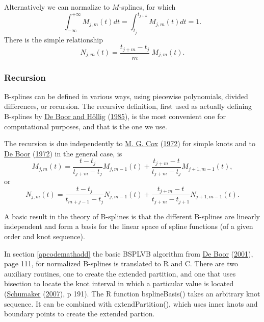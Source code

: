 \documentclass[
  12pt,
]{book}
\theoremstyle{definition}
\theoremstyle{definition}
\theoremstyle{definition}
\theoremstyle{definition}
\theoremstyle{remark}
\begin{document}
Alternatively we can normalize to \(M\)-splines, for which
\begin{equation}\label{E:mint}
\int_{-\infty}^{+\infty}M_{j,m}(t)dt=\int_{t_j}^{t_{j+k}}M_{j,m}(t)dt=1.
\end{equation}
There is the simple relationship
\begin{equation}\label{E:NM}
N_{j,m}(t)=\frac{t_{j+m}-t_j}{m}\ M_{j,m}(t).
\end{equation}

\hypertarget{mathbrecursion}{%
\subsubsection{Recursion}\label{mathbrecursion}}

B-splines can be defined in various ways, using piecewise polynomials, divided differences, or recursion. The recursive definition, first used as actually defining B-splines by \protect\hyperlink{ref-deboor_hollig_85}{De Boor and Höllig} (\protect\hyperlink{ref-deboor_hollig_85}{1985}), is the most convenient one for computational purposes, and that is the one we use.

The recursion is due independently to \protect\hyperlink{ref-cox_72}{M. G. Cox} (\protect\hyperlink{ref-cox_72}{1972}) for simple knots and to \protect\hyperlink{ref-deboor_72}{De Boor} (\protect\hyperlink{ref-deboor_72}{1972}) in the general case, is
\begin{equation}\label{E:Mspline}
M_{j,m}(t)=\frac{t-t_j}{t_{j+m}-t_j}M_{j,m-1}(t)+\frac{t_{j+m}-t}{t_{j+m}-t_j}M_{j+1,m-1}(t),
\end{equation}
or
\begin{equation}\label{E:Nspline}
N_{j,m}(t)=\frac{t-t_j}{t_{m+j-1}-t_j}N_{j,m-1}(t)+\frac{t_{j+m}-t}{t_{j+m}-t_{j+1}}N_{j+1,m-1}(t).
\end{equation}

A basic result in the theory of B-splines is that the different B-splines are linearly independent and form a basis for the linear space of spline functions (of a given order and knot sequence).

In section \ref{apcodemathadd} the basic BSPLVB algorithm from \protect\hyperlink{ref-deboor_01}{De Boor} (\protect\hyperlink{ref-deboor_01}{2001}), page 111, for normalized B-splines is translated to R and C. There are two auxiliary routines, one to create the extended partition, and one that uses bisection to locate the knot interval in which a particular value is located (\protect\hyperlink{ref-schumaker_07}{Schumaker} (\protect\hyperlink{ref-schumaker_07}{2007}), p 191). The R function bsplineBasis() takes an arbitrary knot sequence. It can be combined with extendPartition(), which uses inner knots and boundary points to create the extended partion.
\end{document}
